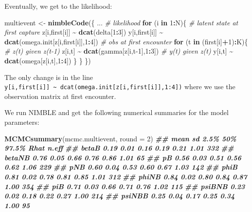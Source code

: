 \documentclass[
  12pt,
]{krantz}
\newenvironment{Shaded}{\begin{snugshade}}{\end{snugshade}}
\newcommand{\AttributeTok}[1]{\textcolor[rgb]{0.13,0.29,0.53}{#1}}
\newcommand{\CommentTok}[1]{\textcolor[rgb]{0.56,0.35,0.01}{\textit{#1}}}
\newcommand{\ControlFlowTok}[1]{\textcolor[rgb]{0.13,0.29,0.53}{\textbf{#1}}}
\newcommand{\DecValTok}[1]{\textcolor[rgb]{0.00,0.00,0.81}{#1}}
\newcommand{\DocumentationTok}[1]{\textcolor[rgb]{0.56,0.35,0.01}{\textbf{\textit{#1}}}}
\newcommand{\FunctionTok}[1]{\textcolor[rgb]{0.13,0.29,0.53}{\textbf{#1}}}
\newcommand{\NormalTok}[1]{#1}
\newcommand{\OtherTok}[1]{\textcolor[rgb]{0.56,0.35,0.01}{#1}}
\newcommand{\SpecialCharTok}[1]{\textcolor[rgb]{0.81,0.36,0.00}{\textbf{#1}}}
\begin{document}
Eventually, we get to the likelihood:

\begin{Shaded}
\begin{Highlighting}[]
\NormalTok{multievent }\OtherTok{\textless{}{-}} \FunctionTok{nimbleCode}\NormalTok{(\{}
\NormalTok{...}
  \CommentTok{\# likelihood}
  \ControlFlowTok{for}\NormalTok{ (i }\ControlFlowTok{in} \DecValTok{1}\SpecialCharTok{:}\NormalTok{N)\{}
    \CommentTok{\# latent state at first capture}
\NormalTok{    z[i,first[i]] }\SpecialCharTok{\textasciitilde{}} \FunctionTok{dcat}\NormalTok{(delta[}\DecValTok{1}\SpecialCharTok{:}\DecValTok{3}\NormalTok{])}
\NormalTok{    y[i,first[i]] }\SpecialCharTok{\textasciitilde{}} \FunctionTok{dcat}\NormalTok{(omega.init[z[i,first[i]],}\DecValTok{1}\SpecialCharTok{:}\DecValTok{4}\NormalTok{]) }\CommentTok{\# obs at first encounter}
    \ControlFlowTok{for}\NormalTok{ (t }\ControlFlowTok{in}\NormalTok{ (first[i]}\SpecialCharTok{+}\DecValTok{1}\NormalTok{)}\SpecialCharTok{:}\NormalTok{K)\{}
      \CommentTok{\# z(t) given z(t{-}1)}
\NormalTok{      z[i,t] }\SpecialCharTok{\textasciitilde{}} \FunctionTok{dcat}\NormalTok{(gamma[z[i,t}\DecValTok{{-}1}\NormalTok{],}\DecValTok{1}\SpecialCharTok{:}\DecValTok{3}\NormalTok{])}
      \CommentTok{\# y(t) given z(t)}
\NormalTok{      y[i,t] }\SpecialCharTok{\textasciitilde{}} \FunctionTok{dcat}\NormalTok{(omega[z[i,t],}\DecValTok{1}\SpecialCharTok{:}\DecValTok{4}\NormalTok{])}
\NormalTok{    \}}
\NormalTok{  \}}
\NormalTok{\})}
\end{Highlighting}
\end{Shaded}

The only change is in the line \texttt{y{[}i,first{[}i{]}{]}\ \textasciitilde{}\ dcat(omega.init{[}z{[}i,first{[}i{]}{]},1:4{]})} where we use the observation matrix at first encounter.

We run NIMBLE and get the following numerical summaries for the model parameters:

\begin{Shaded}
\begin{Highlighting}[]
\FunctionTok{MCMCsummary}\NormalTok{(mcmc.multievent, }\AttributeTok{round =} \DecValTok{2}\NormalTok{)}
\DocumentationTok{\#\#        mean   sd 2.5\%  50\% 97.5\% Rhat n.eff}
\DocumentationTok{\#\# betaB  0.19 0.01 0.16 0.19  0.21 1.01   332}
\DocumentationTok{\#\# betaNB 0.76 0.05 0.66 0.76  0.86 1.01    65}
\DocumentationTok{\#\# pB     0.56 0.03 0.51 0.56  0.62 1.06   229}
\DocumentationTok{\#\# pNB    0.60 0.04 0.53 0.60  0.67 1.03   142}
\DocumentationTok{\#\# phiB   0.81 0.02 0.78 0.81  0.85 1.01   312}
\DocumentationTok{\#\# phiNB  0.84 0.02 0.80 0.84  0.87 1.00   354}
\DocumentationTok{\#\# piB    0.71 0.03 0.66 0.71  0.76 1.02   115}
\DocumentationTok{\#\# psiBNB 0.23 0.02 0.18 0.22  0.27 1.00   214}
\DocumentationTok{\#\# psiNBB 0.25 0.04 0.17 0.25  0.34 1.00    95}
\end{Highlighting}
\end{Shaded}
\end{document}
